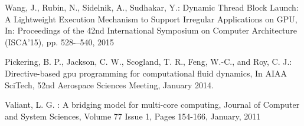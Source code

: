 \documentclass[conference]{IEEEtran}
\begin{document}
\begin{thebibliography}{4}
	 Wang, J., Rubin, N., Sidelnik, A., Sudhakar, Y.: Dynamic Thread Block Launch: A Lightweight Execution Mechanism to Support Irregular Applications on GPU, In: Proceedings of the 42nd International Symposium on Computer Architecture  (ISCA'15), pp. 528-–540, 2015
	
	Pickering, B. P., Jackson, C. W., Scogland, T. R., Feng, W.-C., and Roy, C. J.: Directive-based gpu programming for computational fluid dynamics, In AIAA SciTech, 52nd Aerospace Sciences Meeting, January 2014.
	
	 Valiant, L. G. : A bridging model for multi-core computing, Journal of Computer and System Sciences, Volume 77 Issue 1, Pages 154-166, January, 2011
	
\end{thebibliography}
\end{document}

